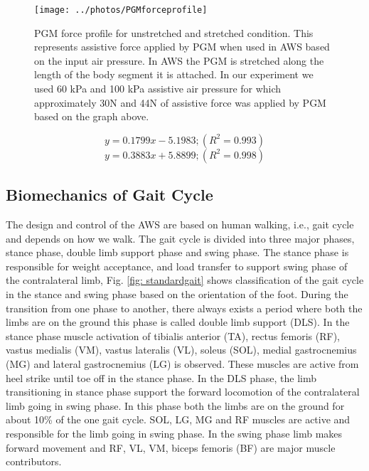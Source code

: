 \documentclass[letterpaper, 10 pt, conference]{ieeeconf}  %
\begin{document}
\begin{figure}
	\centering
	\texttt{[image: ../photos/PGMforceprofile]}
	\caption{PGM force profile for unstretched and stretched condition. This represents assistive force applied by PGM when used in AWS based on the input air pressure. In AWS the PGM is stretched along the length of the body segment it is attached. In our experiment we used 60 kPa and 100 kPa assistive air pressure for which approximately 30N and 44N of assistive force was applied by PGM based on the graph above.}
	\label{fig:pgmforceprofile}
\end{figure}


\begin{equation}\label{pgmunstreched}
y=0.1799x - 5.1983; (R^2=0.993)
\end{equation}
\begin{equation}\label{pgmstreched}
y = 0.3883x + 5.8899; (R^2=0.998)
\end{equation}

\subsection{Biomechanics of Gait Cycle } \label{method:gaitcycle}
The design and control of the AWS are based on human walking, i.e., gait cycle and depends on how we walk. The gait cycle is divided into three major phases, stance phase, double limb support phase and swing phase. The stance phase is responsible for weight acceptance, and load transfer to support swing phase of the contralateral limb, Fig. \ref{fig: standardgait} shows classification of the gait cycle in the stance and swing phase based on the orientation of the foot. During the transition from one phase to another, there always exists a period where both the limbs are on the ground this phase is called double limb support (DLS). In the stance phase muscle activation of tibialis anterior (TA), rectus femoris (RF), vastus medialis (VM), vastus lateralis (VL), soleus (SOL), medial gastrocnemius (MG) and lateral gastrocnemius (LG) is observed. These muscles are active from heel strike until toe off in the stance phase. In the DLS phase, the limb transitioning in stance phase support the forward locomotion of the contralateral limb going in swing phase. In this phase both the limbs are on the ground for about 10\% of the one gait cycle. SOL, LG, MG and RF muscles are active and responsible for the limb going in swing phase. In the swing phase limb makes forward movement and RF, VL, VM, biceps femoris (BF) are major muscle contributors. 
\end{document}
